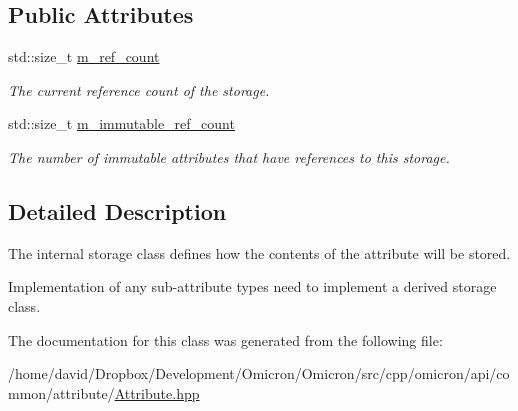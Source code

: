 \subsection*{Public Attributes}
\begin{DoxyCompactItemize}
\item 
std\+::size\+\_\+t \hyperlink{classomi_1_1_attribute_1_1_storage_a2c0290c90619a37d319085be048e8406}{m\+\_\+ref\+\_\+count}\hypertarget{classomi_1_1_attribute_1_1_storage_a2c0290c90619a37d319085be048e8406}{}\label{classomi_1_1_attribute_1_1_storage_a2c0290c90619a37d319085be048e8406}

\begin{DoxyCompactList}\small\item\em The current reference count of the storage. \end{DoxyCompactList}\item 
std\+::size\+\_\+t \hyperlink{classomi_1_1_attribute_1_1_storage_aaf58a01227aaea723df2a6ecde337090}{m\+\_\+immutable\+\_\+ref\+\_\+count}\hypertarget{classomi_1_1_attribute_1_1_storage_aaf58a01227aaea723df2a6ecde337090}{}\label{classomi_1_1_attribute_1_1_storage_aaf58a01227aaea723df2a6ecde337090}

\begin{DoxyCompactList}\small\item\em The number of immutable attributes that have references to this storage. \end{DoxyCompactList}\end{DoxyCompactItemize}


\subsection{Detailed Description}
The internal storage class defines how the contents of the attribute will be stored. 

Implementation of any sub-\/attribute types need to implement a derived storage class. 

The documentation for this class was generated from the following file\+:\begin{DoxyCompactItemize}
\item 
/home/david/\+Dropbox/\+Development/\+Omicron/\+Omicron/src/cpp/omicron/api/common/attribute/\hyperlink{_attribute_8hpp}{Attribute.\+hpp}\end{DoxyCompactItemize}
